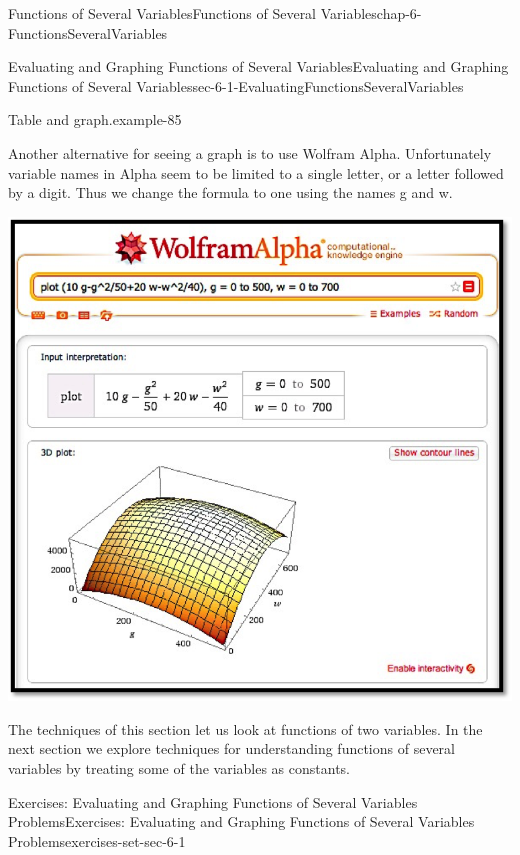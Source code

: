 \documentclass[oneside,10pt,]{book}
\numberwithin{equation}{section}
\begin{document}
\begin{chapterptx}{Functions of Several Variables}{}{Functions of Several Variables}{}{}{chap-6-FunctionsSeveralVariables}
\begin{sectionptx}{Evaluating and Graphing Functions of Several Variables}{}{Evaluating and Graphing Functions of Several Variables}{}{}{sec-6-1-EvaluatingFunctionsSeveralVariables}
\begin{example}{Table and graph.}{example-85}
\begin{sidebyside}{1}{0.2}{0.2}{0}
\begin{sbspanel}{0.6}
\end{sbspanel}%
\end{sidebyside}%
\par
\hypertarget{p-2144}{}%
Another alternative for seeing a graph is to use Wolfram Alpha.  Unfortunately variable names in Alpha seem to be limited to a single letter, or a letter followed by a digit.  Thus we change the formula to one using the names g and w.%
\begin{sidebyside}{1}{0.1}{0.1}{0}%
\begin{sbspanel}{0.8}%
\includegraphics[width=1\linewidth]{images/sec-6-1-14.png}
\end{sbspanel}%
\end{sidebyside}%
\end{example}
\hypertarget{p-2145}{}%
The techniques of this section let us look at functions of two variables.  In the next section we explore techniques for understanding functions of several variables by treating some of the variables as constants.%
%
%
\typeout{************************************************}
\typeout{************************************************}
%
\begin{exercises-subsection-numberless}{Exercises: Evaluating and Graphing Functions of Several Variables Problems}{}{Exercises: Evaluating and Graphing Functions of Several Variables Problems}{}{}{exercises-set-sec-6-1}

\end{exercises-subsection-numberless}
\end{sectionptx}
\end{chapterptx}
\end{document}
